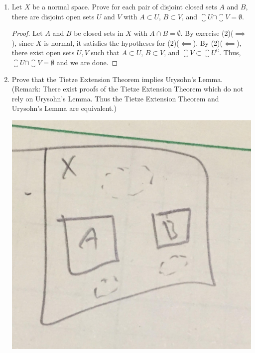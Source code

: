 \documentclass[letterpaper]{article}
\begin{document}
\begin{enumerate}
\begin{proof}
Since $A\subset B^\complement$, and $B^\complement$ is open, then there exists an open set $U$ with $A\subset U\subset \closure{U}\subset B^\complement$. Similarly, since $B\subset \closure{U}^\complement$, and $\closure{U}^\complement$ is open, then there exists an open set $V$ with $B\subset V \subset \closure{V}\subset \closure{U}^\complement$. Since $V\subset \closure{U}^\complement$, then $V\cap \closure{U}=\emptyset$, so $V\cap U=\emptyset$. 

Thus, $A\subset U$, $B\subset V$, and $U\cap V=\emptyset$. 
\end{proof}

\item Let $X$ be a normal space. Prove for each pair of disjoint closed sets $A$ and $B$, there are disjoint open sets $U$ and $V$ with $A \subset U$, $B \subset V$, and $\closure{U} \cap \closure{V} = \emptyset$.
\begin{proof}
Let $A$ and $B$ be closed sets in $X$ with $A\cap B=\emptyset$. By exercise (2)($\implies$), since $X$ is normal, it satisfies the hypotheses for (2)($\impliedby$). By (2)($\impliedby$), there exist open sets $U,V$ such that $A \subset U$, $B \subset V$, and $\closure{V} \subset \closure{U}^\complement$. Thus, $\closure{U} \cap \closure{V} = \emptyset$ and we are done. 
\end{proof}

\item Prove that the Tietze Extension Theorem implies Urysohn’s Lemma. (Remark: There exist proofs of the
Tietze Extension Theorem which do not rely on Urysohn’s Lemma. Thus the Tietze Extension Theorem
and Urysohn’s Lemma are equivalent.)

\begin{center}
\includegraphics[scale=.07]{hw9_prob4}
\end{center}


\end{enumerate}
\end{document}
